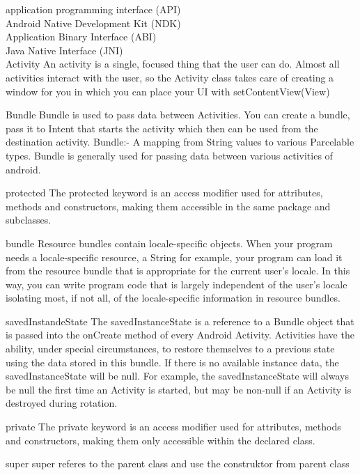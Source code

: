\documentclass[a4paper,12pt]{article}
\begin{document}
application programming interface (API)\\
Android Native Development Kit (NDK) \\
Application Binary Interface (ABI) \\
Java Native Interface (JNI) \\

Activity
An activity is a single, focused thing that the user can do.
Almost all activities interact with the user, so the Activity class takes care of creating a window for you in which you can place your UI with setContentView(View)

Bundle
Bundle is used to pass data between Activities.
You can create a bundle, pass it to Intent that starts the activity which then can be used from the destination activity.
Bundle:- A mapping from String values to various Parcelable types. Bundle is generally used for passing data between various activities of android.


protected
The protected keyword is an access modifier used for attributes, methods and constructors, 
making them accessible in the same package and subclasses.

bundle
Resource bundles contain locale-specific objects.
 When your program needs a locale-specific resource, a String for example,
 your program can load it from the resource bundle that is appropriate for the current user's locale. In this way, 
you can write program code that is largely independent of the user's locale isolating most, if not all, 
of the locale-specific information in resource bundles.

savedInstandeState
The savedInstanceState is a reference to a Bundle object that is passed into the onCreate method of every Android Activity.
 Activities have the ability, under special circumstances, 
to restore themselves to a previous state using the data stored in this bundle.
 If there is no available instance data, the savedInstanceState will be null. For example, 
the savedInstanceState will always be null the first time an Activity is started, but may be non-null if an Activity is destroyed during rotation.

private
The private keyword is an access modifier used for attributes,
 methods and constructors, 
making them only accessible within the declared class.

super
super referes to the parent class and use the construktor from parent class
\end{document}
